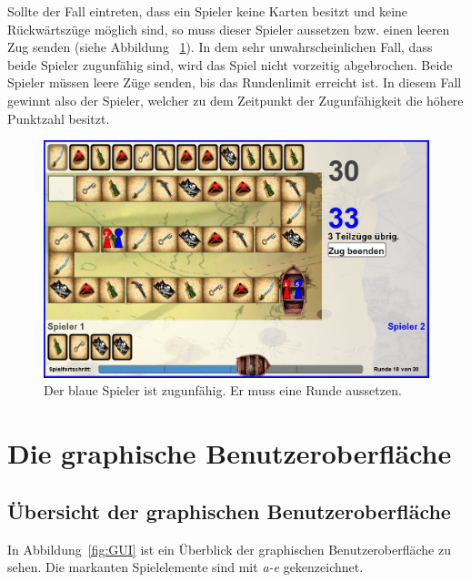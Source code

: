 \documentclass[a4paper, ngerman]{scrartcl}
\begin{document}
	Sollte der Fall eintreten, dass ein Spieler keine Karten besitzt und keine
	Rückwärtszüge möglich sind, so muss dieser Spieler aussetzen bzw. einen leeren
	Zug senden (siehe Abbildung ~\ref{fig:zugunfaehig}). In dem sehr
	unwahrscheinlichen Fall, dass beide Spieler zugunfähig sind, wird das Spiel nicht vorzeitig abgebrochen. Beide Spieler müssen
	leere Züge senden, bis das Rundenlimit erreicht ist. In diesem Fall gewinnt
	also der Spieler, welcher zu dem Zeitpunkt der Zugunfähigkeit die höhere
	Punktzahl besitzt.
	\begin{figure}[h]
	 \centering
	 \includegraphics[scale = 0.3]{bilder/zugunfaehig}
	 \caption{Der blaue Spieler ist zugunfähig. Er muss eine Runde aussetzen.}
	 \label{fig:zugunfaehig}
	\end{figure}
	
\section{Die graphische Benutzeroberfläche}
\subsection{Übersicht der graphischen Benutzeroberfläche}
	In Abbildung~\ref{fig:GUI} ist ein Überblick der graphischen Benutzeroberfläche
	zu sehen. Die markanten Spielelemente sind mit \emph{a-e} gekenzeichnet.
	
\end{document}
